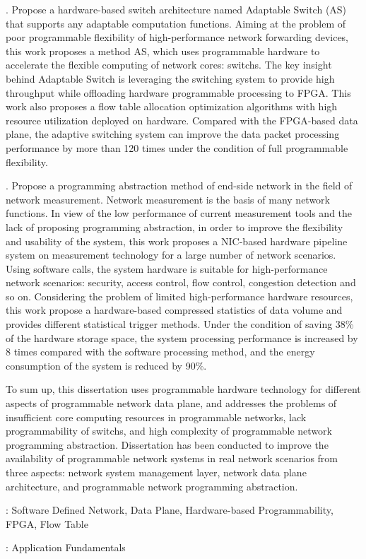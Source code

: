 . Propose a hardware-based switch architecture named Adaptable Switch (AS) that supports any adaptable computation functions.
Aiming at the problem of poor programmable flexibility of high-performance network forwarding devices, this work proposes a method AS, which uses programmable hardware to accelerate the flexible computing of network cores: switchs.
The key insight behind Adaptable Switch is leveraging the switching system to provide high throughput while offloading hardware programmable processing to FPGA. 
This work also proposes a flow table allocation optimization algorithms with high resource utilization deployed on hardware.
Compared with the FPGA-based data plane, the adaptive switching system can improve the data packet processing performance by more than 120 times under the condition of full programmable flexibility.\newline

. Propose a programming abstraction method of end-side network in the field of network measurement.
Network measurement is the basis of many network functions. In view of the low performance of current measurement tools and the lack of proposing programming abstraction, in order to improve the flexibility and usability of the system, this work proposes a NIC-based hardware pipeline system on measurement technology for a large number of network scenarios.
Using software calls, the system hardware is suitable for high-performance network scenarios: security, access control, flow control, congestion detection and so on.
Considering the problem of limited high-performance hardware resources, this work propose a hardware-based compressed statistics of data volume and provides different statistical trigger methods.
Under the condition of saving 38\% of the hardware storage space, the system processing performance is increased by 8 times compared with the software processing method, and the energy consumption of the system is reduced by 90\%.\newline

\noindent To sum up, this dissertation uses programmable hardware technology for different aspects of programmable network data plane, and addresses the problems of insufficient core computing resources in programmable networks, lack  programmability of switchs, and high complexity of programmable network programming abstraction. Dissertation has been conducted to improve the availability of programmable network systems in real network scenarios from three aspects: network system management layer, network data plane architecture, and programmable network programming abstraction.


\vspace{\baselineskip}
: Software Defined Network, Data Plane, Hardware-based Programmability, FPGA, Flow Table



\vspace{\baselineskip}
: Application Fundamentals

\clearpage
